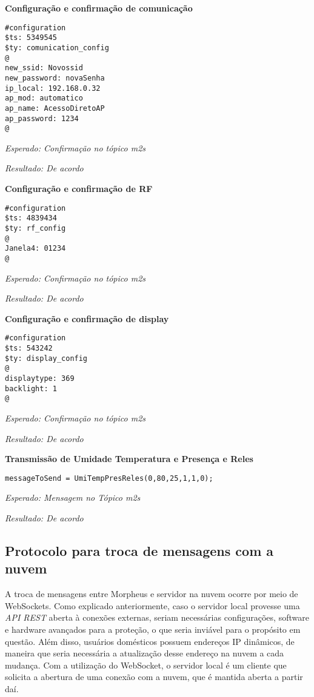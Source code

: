 \textbf{Configuração e confirmação de comunicação}
\begin{lstlisting}
#configuration
$ts: 5349545
$ty: comunication_config
@
new_ssid: Novossid
new_password: novaSenha
ip_local: 192.168.0.32
ap_mod: automatico
ap_name: AcessoDiretoAP
ap_password: 1234
@
\end{lstlisting}

\emph{Esperado: Confirmação no tópico \wmqtt{} m2s}

\emph{Resultado: De acordo}

\textbf{Configuração e confirmação de RF}
\begin{lstlisting}
#configuration
$ts: 4839434
$ty: rf_config
@
Janela4: 01234
@
\end{lstlisting}

\emph{Esperado: Confirmação no tópico \wmqtt{} m2s}

\emph{Resultado: De acordo}

\textbf{Configuração e confirmação de display}
\begin{lstlisting}
#configuration
$ts: 543242
$ty: display_config
@
displaytype: 369
backlight: 1
@
\end{lstlisting}

\emph{Esperado: Confirmação no tópico \wmqtt{} m2s}

\emph{Resultado: De acordo}

\textbf{Transmissão de Umidade Temperatura e Presença e Reles}
\begin{lstlisting}
messageToSend = UmiTempPresReles(0,80,25,1,1,0);
\end{lstlisting}

\emph{Esperado: Mensagem no Tópico \wmqtt{} m2s}

\emph{Resultado: De acordo}

\subsection{Protocolo para troca de mensagens com a nuvem}
A troca de mensagens entre Morpheus e servidor na nuvem ocorre por meio de WebSockets. Como explicado anteriormente, caso o servidor local provesse uma \emph{API REST} aberta à conexões externas, seriam necessárias configurações, software e hardware avançados para a proteção, o que seria inviável para o propósito em questão. Além disso, usuários domésticos possuem endereços IP dinâmicos, de maneira que seria necessária a atualização desse endereço na nuvem a cada mudança. Com a utilização do WebSocket, o servidor local é um cliente que solicita a abertura de uma conexão com a nuvem, que é mantida aberta a partir daí.


